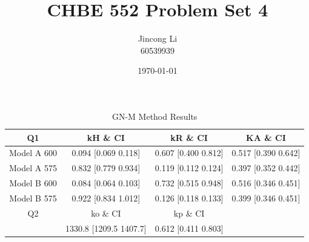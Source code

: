 \documentclass[a4paper,12pt]{article} %
\begin{document}
\setlength{\parskip}{1em} 
\setlength{\parindent}{0pt}
\newcommand{\vect}[1]{\mathbf{#1}}

\title{CHBE 552 Problem Set 4}
\author{Jincong Li \\ 60539939}
\date{\today}
\maketitle

\begin{table}[ht]
    \caption{GN-M Method Results}
    \centering
    \begin{tabular}{|c|c|c|c|}
        \hline
        Q1 & kH \& CI & kR \& CI& KA \& CI\\
        \hline   
        Model A 600& 0.094 [0.069 0.118]& 0.607 [0.400 0.812]& 0.517 [0.390  0.642] \\
        Model A 575& 0.832 [0.779 0.934]& 0.119 [0.112 0.124]& 0.397 [0.352 0.442] \\
        Model B 600& 0.084 [0.064 0.103]& 0.732 [0.515 0.948]& 0.516 [0.346  0.451] \\
        Model B 575& 0.922 [0.834 1.012]& 0.126 [0.118 0.133]& 0.399 [0.346  0.451] \\
        \hline
        Q2 & ko \& CI& kp \& CI&\\
        \hline
        & 1330.8 [1209.5 1407.7] & 0.612 [0.411 0.803] &  \\
        \hline
    \end{tabular}
\end{table}
\end{document}
